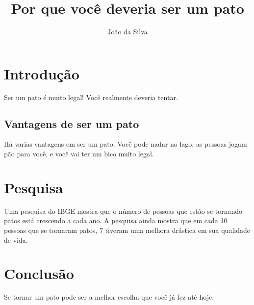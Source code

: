 \documentclass[12pt, a4paper]{article}
\title{Por que você deveria ser um pato}
\author{João da Silva}
\date{}
\begin{document}
  \maketitle

  \tableofcontents

  \section{Introdução}

  Ser um pato é muito legal! Você realmente deveria tentar.

    \subsection{Vantagens de ser um pato}

    Há varias vantagens em ser um pato. Você pode nadar no lago, as pessoas jogam pão para você, e você vai ter um bico muito legal.

  \section{Pesquisa}

  Uma pesquisa do IBGE mostra que o número de pessoas que estão se tornando patos está crescendo a cada ano. A pesquisa ainda mostra que em cada 10 pessoas que se tornaram patos, 7 tiveram uma melhora drástica em sua qualidade de vida.

  \section{Conclusão}

  Se tornar um pato pode ser a melhor escolha que você já fez até hoje.
\end{document}

